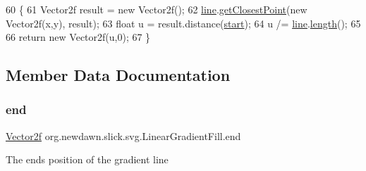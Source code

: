 \begin{DoxyCode}
60                                                   \{
61         Vector2f result = \textcolor{keyword}{new} Vector2f();
62         \mbox{\hyperlink{classorg_1_1newdawn_1_1slick_1_1svg_1_1_linear_gradient_fill_a3c9d1489a824879ba1e0b3a95a08dbda}{line}}.\mbox{\hyperlink{classorg_1_1newdawn_1_1slick_1_1geom_1_1_line_ae555b65b604e0bed3e650ab156375a99}{getClosestPoint}}(\textcolor{keyword}{new} Vector2f(x,y), result);
63         \textcolor{keywordtype}{float} u = result.distance(\mbox{\hyperlink{classorg_1_1newdawn_1_1slick_1_1svg_1_1_linear_gradient_fill_acd016204314fd234afb74aa32282ac7d}{start}});
64         u /= \mbox{\hyperlink{classorg_1_1newdawn_1_1slick_1_1svg_1_1_linear_gradient_fill_a3c9d1489a824879ba1e0b3a95a08dbda}{line}}.\mbox{\hyperlink{classorg_1_1newdawn_1_1slick_1_1geom_1_1_line_aae00113aea8d0d253962614a873f05a1}{length}}();
65         
66         \textcolor{keywordflow}{return} \textcolor{keyword}{new} Vector2f(u,0);
67     \}
\end{DoxyCode}


\subsection{Member Data Documentation}
\mbox{\label{classorg_1_1newdawn_1_1slick_1_1svg_1_1_linear_gradient_fill_a708d041bfb9a710bdb328561eacd169e}} 
\subsubsection{\texorpdfstring{end}{end}}
{\footnotesize\ttfamily \mbox{\hyperlink{classorg_1_1newdawn_1_1slick_1_1geom_1_1_vector2f}{Vector2f}} org.\+newdawn.\+slick.\+svg.\+Linear\+Gradient\+Fill.\+end\hspace{0.3cm}{\ttfamily [private]}}

The ends position of the gradient line \mbox{\label{classorg_1_1newdawn_1_1slick_1_1svg_1_1_linear_gradient_fill_a91933ccdb47076eca69f1ebe6886933c}} 

